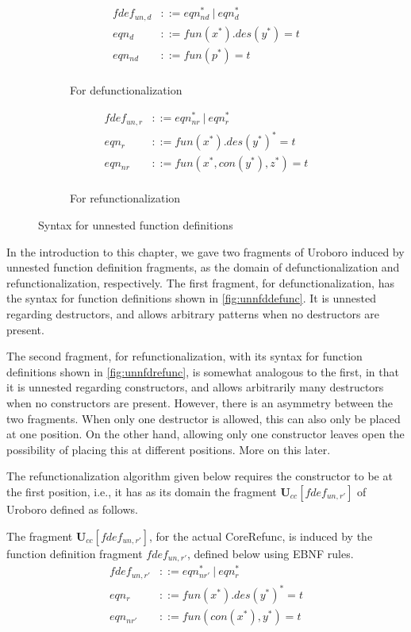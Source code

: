 \begin{figure}
\begin{subfigure}{0.5\textwidth}
\begin{align*}
fdef_{un,d} &::= eqn_{nd}^* ~ | ~ eqn_d^* \\
eqn_d &::= fun(x^*).des(y^*) = t \\
eqn_{nd} &::= fun(p^*) = t \\
\end{align*}
\caption{For defunctionalization}
\label{fig:unnfddefunc}
\end{subfigure}
\begin{subfigure}{0.5\textwidth}
\begin{align*}
fdef_{un,r} &::= eqn_{nr}^* ~ | ~ eqn_r^* \\
eqn_r &::= fun(x^*).des(y^*)^* = t \\
eqn_{nr} &::= fun(x^*, con(y^*), z^*) = t \\
\end{align*}
\caption{For refunctionalization}
\label{fig:unnfdrefunc}
\end{subfigure}
\caption{Syntax for unnested function definitions}
\end{figure}

In the introduction to this chapter, we gave two fragments of Uroboro induced by unnested function definition fragments, as the domain of defunctionalization and refunctionalization, respectively. The first fragment, for defunctionalization, has the syntax for function definitions shown in \autoref{fig:unnfddefunc}. It is unnested regarding destructors, and allows arbitrary patterns when no destructors are present.

The second fragment, for refunctionalization, with its syntax for function definitions shown in \autoref{fig:unnfdrefunc}, is somewhat analogous to the first, in that it is unnested regarding constructors, and allows arbitrarily many destructors when no constructors are present. However, there is an asymmetry between the two fragments. When only one destructor is allowed, this can also only be placed at one position. On the other hand, allowing only one constructor leaves open the possibility of placing this at different positions. More on this later.

The refunctionalization algorithm given below requires the constructor to be at the first position, i.e., it has as its domain the fragment $\mathbf{U}_{cc}[fdef_{un,r'}]$ of Uroboro defined as follows.

\begin{definition}
The fragment $\mathbf{U}_{cc}[fdef_{un,r'}]$, for the actual \textsf{CoreRefunc}, is induced by the function definition fragment $fdef_{un,r'}$, defined below using EBNF rules.
\begin{align*}
fdef_{un,r'} &::= eqn_{nr'}^* ~ | ~ eqn_r^* \\
eqn_r &::= fun(x^*).des(y^*)^* = t \\
eqn_{nr'} &::= fun(con(x^*), y^*) = t \\
\end{align*}
\end{definition}

